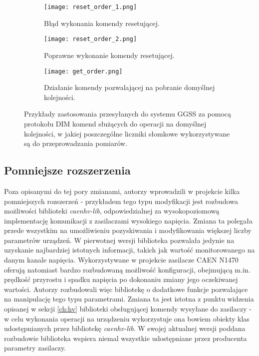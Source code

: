 \begin{figure}[H]
\centering

\begin{subfigure}{0.45\textwidth}
\centering
\texttt{[image: reset\_order\_1.png]}
\caption{Błąd wykonania komendy resetującej.}
\label{fig:order_com_1}
\end{subfigure}
\begin{subfigure}{0.45\textwidth}
\centering
\texttt{[image: reset\_order\_2.png]}
\caption{Poprawne wykonanie komendy resetującej.}
\label{fig:order_com_2}
\end{subfigure}

\vspace*{8pt}%

\begin{subfigure}{0.45\textwidth}
\centering
\texttt{[image: get\_order.png]}
\caption{Działanie komendy pozwalającej na pobranie domyślnej kolejności.}
\label{fig:order_com_3}
\end{subfigure}

\caption{Przykłady zastosowania przesyłanych do systemu GGSS za pomocą protokołu DIM komend służących do operacji na domyślnej kolejności, w jakiej poszczególne liczniki słomkowe wykorzystywane są do przeprowadzania pomiarów.}
\label{fig:order_com}
\end{figure}


\subsection{Pomniejsze rozszerzenia}
Poza opisanymi do tej pory zmianami, autorzy wprowadzili w projekcie kilka pomniejszych rozszerzeń - przykładem tego typu modyfikacji jest rozbudowa możliwości biblioteki \emph{caenhv-lib}, odpowiedzialnej za wysokopoziomową implementację komunikacji z zasilaczami wysokiego napięcia. Zmiana ta polegała przede wszystkim na umożliwieniu pozyskiwania i modyfikowania większej liczby parametrów urządzeń. W pierwotnej wersji biblioteka pozwalała jedynie na uzyskanie najbardziej istotnych informacji, takich jak wartość monitorowanego na danym kanale napięcia. Wykorzystywane w projekcie zasilacze CAEN N1470 oferują natomiast bardzo rozbudowaną możliwość konfiguracji, obejmującą m.in. prędkość przyrostu i spadku napięcia po dokonaniu zmiany jego oczekiwanej wartości. Autorzy rozbudowali więc bibliotekę o dodatkowe funkcje pozwalające na manipulację tego typu parametrami. Zmiana ta jest istotna z punktu widzenia opisanej w sekcji \ref{ch:hv} biblioteki obsługującej komendy wysyłane do zasilaczy - w celu wykonania operacji na urządzeniu wykorzystuje ona bowiem obiekty klas udostępnianych przez bibliotekę \emph{caenhv-lib}. W swojej aktualnej wersji poddana rozbudowie biblioteka wspiera niemal wszystkie udostępniane przez producenta parametry zasilaczy.
